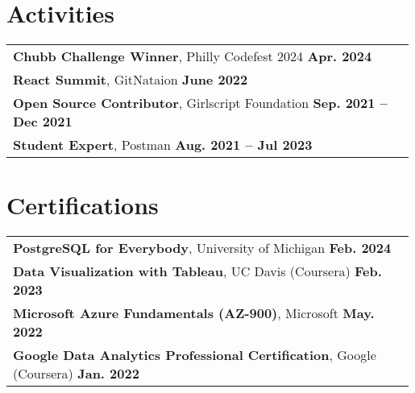 \documentclass[letterpaper,11pt]{article}
\begin{document}
\section{Activities}
\begin{tabular}{p{0.99\linewidth}}
    \hspace{0.15in}\textbf{Chubb Challenge Winner}, Philly Codefest 2024
        \hfill \textbf{Apr. 2024} \\
            \hspace{0.15in}\textbf{React Summit}, GitNataion
        \hfill \textbf{June 2022}\\
    \hspace{0.15in}\textbf{Open Source Contributor}, Girlscript Foundation
        \hfill \textbf{Sep. 2021 -- Dec 2021}\\

    \hspace{0.15in}\textbf{Student Expert}, Postman
        \hfill \textbf{Aug. 2021 -- Jul 2023} 
    
\end{tabular}
\vspace{-15pt}

\section{Certifications}
\begin{tabular}{p{0.99\linewidth}}
    \hspace{0.15in}\textbf{PostgreSQL for Everybody}, University of Michigan
        \hfill \textbf{Feb. 2024} \\
    \hspace{0.15in}\textbf{Data Visualization with Tableau}, UC Davis (Coursera)
        \hfill \textbf{Feb. 2023} \\
    \hspace{0.15in}\textbf{Microsoft Azure Fundamentals (AZ-900)}, Microsoft
        \hfill \textbf{May. 2022} \\
    \hspace{0.15in}\textbf{Google Data Analytics Professional Certification}, Google (Coursera)
        \hfill \textbf{Jan. 2022} \\
\end{tabular}
\end{document}
